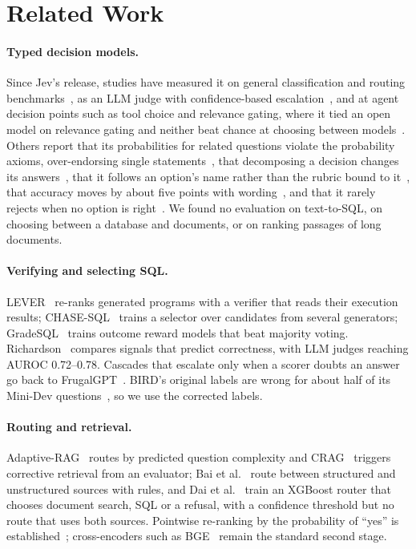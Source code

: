 \documentclass[runningheads,a4paper]{llncs}
\begin{document}
\section{Related Work}
\paragraph{Typed decision models.} Since Jev's release, studies have measured it on general classification and
routing benchmarks~\cite{deusser2026jev}, as an LLM judge with confidence-based escalation~\cite{li2026jevjudge},
and at agent decision points such as tool choice and relevance gating, where it tied an open model on relevance
gating and neither beat chance at choosing between models~\cite{fastslow2026}. Others report that its probabilities
for related questions violate the probability axioms, over-endorsing single statements~\cite{axioms2026}, that
decomposing a decision changes its answers~\cite{coherence2026}, that it follows an option's name rather than the
rubric bound to it~\cite{sun2026typesafe,labels2026}, that accuracy moves by about five points with
wording~\cite{fastslow2026}, and that it rarely rejects when no option is right~\cite{missing2026}. We found no evaluation on text-to-SQL, on choosing between a database and documents, or
on ranking passages of long documents.

\paragraph{Verifying and selecting SQL.} LEVER~\cite{ni2023lever} re-ranks generated programs with a verifier that
reads their execution results; CHASE-SQL~\cite{pourreza2025chase} trains a selector over candidates from several
generators; GradeSQL~\cite{tritto2025gradesql} trains outcome reward models that beat majority voting.
Richardson~\cite{richardson2026predicts} compares signals that predict correctness, with LLM judges reaching AUROC
0.72--0.78. Cascades that escalate only when a scorer doubts an answer go back to FrugalGPT~\cite{chen2023frugalgpt}.
BIRD's original labels are wrong for about half of its Mini-Dev questions~\cite{jin2026annotation}, so we use the
corrected labels.

\paragraph{Routing and retrieval.} Adaptive-RAG~\cite{jeong2024adaptiverag} routes by predicted question complexity
and CRAG~\cite{yan2024crag} triggers corrective retrieval from an evaluator; Bai et al.~\cite{bai2025routing} route
between structured and unstructured sources with rules, and Dai et al.~\cite{dai2026xgboost} train an XGBoost router
that chooses document search, SQL or a refusal, with a confidence threshold but no route that uses both sources. Pointwise re-ranking by the probability of ``yes'' is
established~\cite{nogueira2020monot5,zhuang2023yesno}; cross-encoders such as BGE~\cite{chen2024bgem3} remain the standard second
stage.
\end{document}
